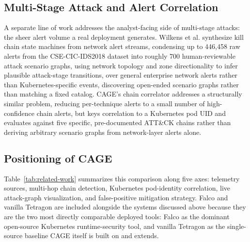 \documentclass{ieeeaccess}
\begin{document}
\subsection{Multi-Stage Attack and Alert Correlation}
\label{subsec:rw-correlation}

A separate line of work addresses the analyst-facing side of
multi-stage attacks: the sheer alert volume a real deployment
generates. Wilkens et al. \cite{ref13} synthesize kill chain state machines
from network alert streams, condensing up to 446,458 raw alerts from
the CSE-CIC-IDS2018 dataset into roughly 700 human-reviewable attack
scenario graphs, using network topology and zone directionality to
infer plausible attack-stage transitions, over general enterprise
network alerts rather than Kubernetes-specific events, discovering
open-ended scenario graphs rather than matching a fixed catalog. CAGE's
chain correlator addresses a structurally similar problem, reducing
per-technique alerts to a small number of high-confidence chain
alerts, but keys correlation to a Kubernetes pod UID and evaluates
against five specific, pre-documented ATT\&CK chains rather than
deriving arbitrary scenario
graphs from network-layer alerts alone.

\subsection{Positioning of CAGE}
\label{subsec:rw-positioning}

Table~\ref{tab:related-work} summarizes this comparison along five axes: telemetry
sources, multi-hop chain detection, Kubernetes pod-identity
correlation, live attack-graph visualization, and false-positive
mitigation strategy. Falco and vanilla Tetragon are included alongside
the systems discussed above because they are the two most directly
comparable deployed tools: Falco as the dominant open-source
Kubernetes runtime-security tool, and vanilla Tetragon as the
single-source baseline CAGE itself is built on and extends.
\end{document}
